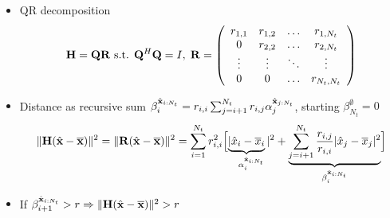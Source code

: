 \documentclass[xcolor=dvipsnames,aspectratio=169]{beamer}
\begin{document}
{  \begin{itemize}
            \item QR decomposition 
            $$\mathbf{H}=\mathbf{Q}\mathbf{R}\textnormal{ s.t. }\mathbf{Q}^H\mathbf{Q}=I,\;\mathbf{R}=\left(\begin{array}{cccc}
            r_{1,1}&r_{1,2}&\dots&r_{1,N_t}\\
            0&r_{2,2}&\dots&r_{2,N_t}\\
            \vdots&\vdots&\ddots&\vdots\\
            0&0&\dots&r_{N_t,N_t}\\
\end{array}\right)$$
            \item Distance as recursive sum $\beta_i^{\hat{\mathbf{x}}_{i:N_t}}=r_{i,i}\sum_{j=i+1}^{N_t}r_{i,j}\alpha_j^{\hat{\mathbf{x}}_{j:N_t}}$, starting $\beta_{N_t}^{\emptyset}=0$
$$\|\mathbf{H}(\hat{\mathbf{x}}-\overline{\mathbf{x}})\|^2=\|\mathbf{R}(\hat{\mathbf{x}}-\overline{\mathbf{x}})\|^2=\sum_{i=1}^{N_t}r_{i,i}^2\Big[\underset{\alpha_i^{\hat{\mathbf{x}}_{i:N_t}}}{\underbrace{|\hat{x}_i-\overline{x}_i}|^2}+\underset{\beta_i^{\hat{\mathbf{x}}_{i:N_t}}}{\underbrace{\sum_{j=i+1}^{N_t}\frac{r_{i,j}}{r_{i,i}}|\hat{x}_j-\overline{x}_j|^2}}\Big]$$
            \item If $\beta_{i+1}^{\hat{\mathbf{x}}_{i:N_t}}>r\Rightarrow \|\mathbf{H}(\hat{\mathbf{x}}-\overline{\mathbf{x}})\|^2>r$
        \end{itemize}

\pagebreak
        
  \begin{columns}
 \begin{column}{6cm}
 

\end{column}
\end{columns}}
\end{document}
